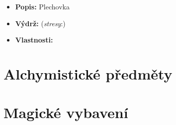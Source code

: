 \documentclass[../main.tex]{subfiles}
\begin{document}
\begin{Predmet}
\begin{itemize}
	\item \textbf{Popis:} Plechovka
	\item \textbf{Výdrž:} (\emph{stresy}:) 
	\item \textbf{Vlastnosti:} 
\end{itemize}
\end{Predmet}

\section{Alchymistické předměty}
\label{sec:alchymisticke-predmety}

\section{Magické vybavení}
\label{sec:magicke-vybaveni}
\end{document}
